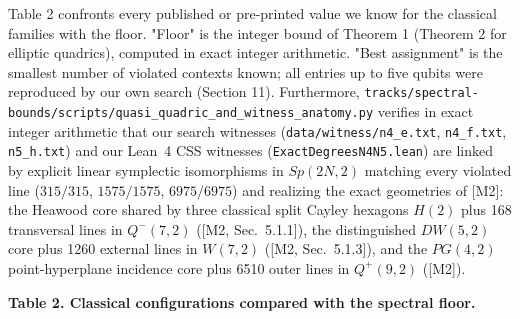 \documentclass[11pt,a4paper]{article}
\begin{document}
Table 2 confronts every published or pre-printed value we know for the classical families with the
floor. "Floor" is the integer bound of Theorem 1 (Theorem 2 for elliptic quadrics), computed in exact
integer arithmetic. "Best assignment" is the smallest number of violated contexts known; all entries up
to five qubits were reproduced by our own search (Section 11). Furthermore,
\nolinkurl{tracks/spectral-bounds/scripts/quasi_quadric_and_witness_anatomy.py} verifies in exact integer
arithmetic that our search witnesses (\nolinkurl{data/witness/n4_e.txt}, \nolinkurl{n4_f.txt},
\nolinkurl{n5_h.txt}) and our Lean~4 CSS witnesses (\nolinkurl{ExactDegreesN4N5.lean}) are linked by explicit
linear symplectic isomorphisms in \(Sp(2N,2)\) matching every violated line (\(315/315\), \(1575/1575\),
\(6975/6975\)) and realizing the exact geometries of {[}M2{]}: the Heawood core shared by three classical
split Cayley hexagons \(H(2)\) plus 168 transversal lines in \(Q^-(7,2)\) ({[}M2, Sec.~5.1.1{]}), the
distinguished \(DW(5,2)\) core plus 1260 external lines in \(W(7,2)\) ({[}M2, Sec.~5.1.3{]}), and the
\(PG(4,2)\) point-hyperplane incidence core plus 6510 outer lines in \(Q^+(9,2)\) ({[}M2{]}).

\textbf{Table 2. Classical configurations compared with the spectral floor.}
\end{document}

